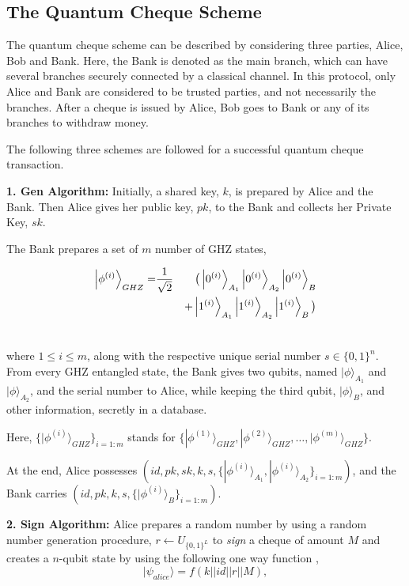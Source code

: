 \documentclass[aps,pra,twocolumn,groupedaddress,showpacs,showkeys]{revtex4-1}
\begin{document}
\subsection{The Quantum Cheque Scheme}
The quantum cheque scheme can be described by considering three parties, Alice, Bob and Bank. Here, the Bank is denoted as the main branch, which can have several branches securely connected by a classical channel. In this protocol, only Alice and Bank are considered to be trusted parties, and not necessarily the branches. After a cheque is issued by Alice, Bob goes to Bank or any of its branches to withdraw money.

The following three schemes are followed for a successful quantum cheque transaction.

\textbf{1. Gen Algorithm:} Initially, a shared key, $k$, is prepared by Alice and the Bank. Then Alice gives her public key, $pk$, to the Bank and collects her Private Key, $sk$.
 
The Bank prepares a set of $m$ number of GHZ states,

\begin{eqnarray}
\Ket{\phi^{(i)}}_{GHZ} = 	&\frac{1}{{\sqrt{2}}}    &   \big( \Ket{0^{(i)}}_{A_1}\Ket{0^{(i)}}_{A_2}\Ket{0^{(i)}}_{B} 	   \\ 	\nonumber
					&				& 	+ \Ket{1^{(i)}}_{A_1}\Ket{1^{(i)}}_{A_2}\Ket{1^{(i)}}_{B} \big)   \\ \nonumber
\end{eqnarray}

where $1 \leq i \leq m$, along with the respective unique serial number $s \in \{0,1\}^n$. From every GHZ entangled state, the Bank gives two qubits, named $|\phi\rangle_{A_{1}}$ and $|\phi\rangle_{A_{2}}$, and the serial number to Alice, while keeping the third qubit, $|\phi\rangle_{B}$, and other information, secretly in a database. 

Here, $ \{ |\phi^{(i)}\rangle_{GHZ}  \}_{i=1:m}$ stands for $ \{ |\phi^{(1)}\rangle_{GHZ}, |\phi^{(2)}\rangle_{GHZ}, \ldots, |\phi^{(m)}\rangle_{GHZ} \}$. 

At the end, Alice possesses $(id, pk, sk, k, s,  \{|\phi^{(i)}\rangle_{A_1}, |\phi^{(i)}\rangle_{A_2} \}_{i=1:m})$,
and the Bank carries $(id, pk, k, s, \{|\phi^{(i)}\rangle_{B} \}_{i=1:m})$. 

\textbf{2. Sign Algorithm:}
Alice prepares a random number by using a random number generation procedure, $r \leftarrow U_{\{0,1\}^L}$ to \emph{sign} a cheque of amount $M$ and creates a $n$-qubit state by using the following one way function \cite{crypt}, 
    $$|\psi_{alice}\rangle = f(k || id || r || M),$$ 
    
\end{document}
